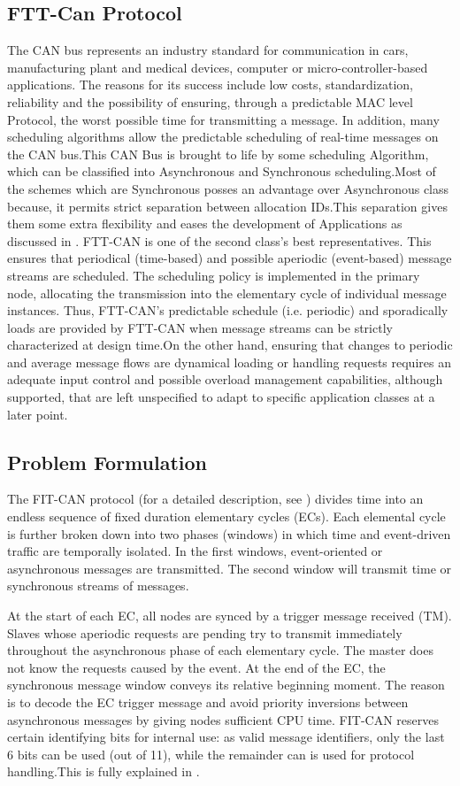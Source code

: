 \documentclass[conference]{IEEEtran}
\begin{document}
\subsection{FTT-Can Protocol}
 The CAN bus represents an industry standard for communication in cars, manufacturing plant and medical devices,  computer or micro-controller-based applications. The reasons for its success include low costs, standardization, reliability and the possibility of ensuring, through a predictable MAC level Protocol, the worst possible time for transmitting a message. In addition, many scheduling algorithms allow the predictable scheduling of real-time messages on the CAN bus.This CAN Bus is brought to life by some scheduling Algorithm, which can be classified into Asynchronous and Synchronous scheduling.Most of the schemes which are Synchronous posses an advantage over Asynchronous class because, it permits strict separation between allocation IDs.This separation gives them some extra flexibility and eases the development of Applications as discussed in \cite{1377703}.
 FTT-CAN is one of the second class's best representatives. This ensures that periodical (time-based) and possible aperiodic (event-based) message streams are scheduled. The scheduling policy is implemented in the primary node, allocating the transmission into the elementary cycle of individual message instances. Thus, FTT-CAN's predictable schedule (i.e. periodic) and sporadically loads are provided by FTT-CAN when message streams can be strictly characterized at design time.On the other hand, ensuring that changes to periodic and average message flows are dynamical loading or handling requests requires an adequate input control and possible overload management capabilities, although supported, that are left unspecified to adapt to specific application classes at a later point.
\subsection{Problem Formulation}
The FIT-CAN protocol (for a detailed description, see \cite{almeida_ftt-can_2002}) divides time into an endless sequence of fixed duration elementary cycles (ECs). Each elemental cycle is further broken down into two phases (windows) in which time and event-driven traffic are temporally isolated. In the first windows, event-oriented or asynchronous messages are transmitted. The second window will transmit time or synchronous streams of messages.

At the start of each EC, all nodes are synced by a trigger message received (TM). Slaves whose aperiodic requests are pending try to transmit immediately throughout the asynchronous phase of each elementary cycle. The master does not know the requests caused by the event.
At the end of the EC, the synchronous message window conveys its relative beginning moment. The reason is to decode the EC trigger message and avoid priority inversions between asynchronous messages by giving nodes sufficient CPU time. FIT-CAN reserves certain identifying bits for internal use: as valid message identifiers, only the last 6 bits can be used (out of 11), while the remainder can is used for protocol handling.This is fully explained in  \cite{1377703}.
\end{document}
